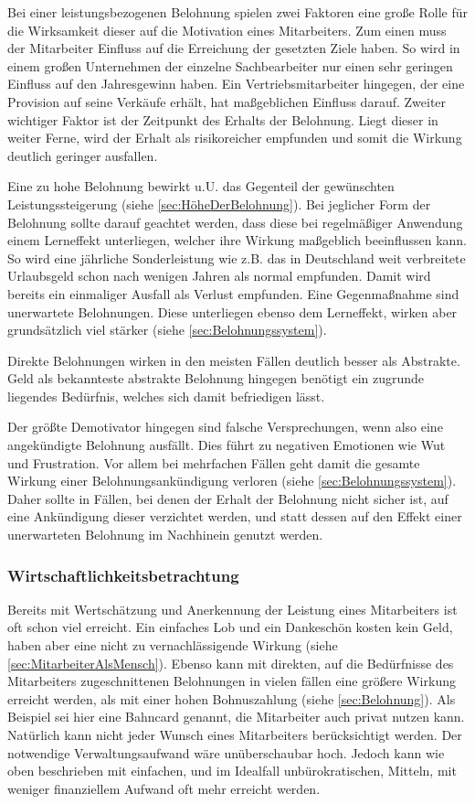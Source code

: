 Bei einer leistungsbezogenen Belohnung spielen zwei Faktoren eine große Rolle für die Wirksamkeit dieser auf die Motivation eines Mitarbeiters. Zum einen muss der Mitarbeiter Einfluss auf die Erreichung der gesetzten Ziele haben. So wird in einem großen Unternehmen der einzelne Sachbearbeiter nur einen sehr geringen Einfluss auf den Jahresgewinn haben. Ein Vertriebsmitarbeiter hingegen, der eine Provision auf seine Verkäufe erhält, hat maßgeblichen Einfluss darauf.
Zweiter wichtiger Faktor ist der Zeitpunkt des Erhalts der Belohnung. Liegt dieser in weiter Ferne, wird der Erhalt als risikoreicher empfunden und somit die Wirkung deutlich geringer ausfallen.

Eine zu hohe Belohnung bewirkt u.U. das Gegenteil der gewünschten Leistungssteigerung (siehe \ref{sec:HöheDerBelohnung}). Bei jeglicher Form der Belohnung sollte darauf geachtet werden, dass diese bei regelmäßiger Anwendung einem Lerneffekt unterliegen, welcher ihre Wirkung maßgeblich beeinflussen kann. So wird eine jährliche Sonderleistung wie z.B. das in Deutschland weit verbreitete Urlaubsgeld schon nach wenigen Jahren als normal empfunden. Damit wird bereits ein einmaliger Ausfall als Verlust empfunden. Eine Gegenmaßnahme sind unerwartete Belohnungen. Diese unterliegen ebenso dem Lerneffekt, wirken aber grundsätzlich viel stärker (siehe \ref{sec:Belohnungssystem}). 

Direkte Belohnungen wirken in den meisten Fällen deutlich besser als Abstrakte. Geld als bekannteste abstrakte Belohnung hingegen benötigt ein zugrunde liegendes Bedürfnis, welches sich damit befriedigen lässt.

Der größte Demotivator hingegen sind falsche Versprechungen, wenn also eine angekündigte Belohnung ausfällt. Dies führt zu negativen Emotionen wie Wut und Frustration. Vor allem bei mehrfachen Fällen geht damit die gesamte Wirkung einer Belohnungsankündigung verloren (siehe \ref{sec:Belohnungssystem}). Daher sollte in Fällen, bei denen der Erhalt der Belohnung nicht sicher ist, auf eine Ankündigung dieser verzichtet werden, und statt dessen auf den Effekt einer unerwarteten Belohnung im Nachhinein genutzt werden. 

\subsubsection{Wirtschaftlichkeitsbetrachtung}
Bereits mit Wertschätzung und Anerkennung der Leistung eines Mitarbeiters ist oft schon viel erreicht. Ein einfaches Lob und ein Dankeschön kosten kein Geld, haben aber eine nicht zu vernachlässigende Wirkung (siehe \ref{sec:MitarbeiterAlsMensch}). Ebenso kann mit direkten, auf die Bedürfnisse des Mitarbeiters zugeschnittenen Belohnungen in vielen fällen eine größere Wirkung erreicht werden, als mit einer hohen Bohnuszahlung (siehe \ref{sec:Belohnung}). Als Beispiel sei hier eine Bahncard genannt, die Mitarbeiter auch privat nutzen kann. 
Natürlich kann nicht jeder Wunsch eines Mitarbeiters berücksichtigt werden. Der notwendige Verwaltungsaufwand wäre unüberschaubar hoch. Jedoch kann wie oben beschrieben mit einfachen, und im Idealfall unbürokratischen, Mitteln, mit weniger finanziellem Aufwand oft mehr erreicht werden. 

